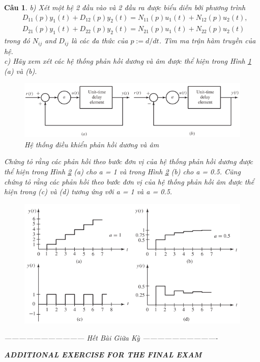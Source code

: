 \documentclass[11pt]{article}
\newtheorem{bt}{Câu}
\begin{document}
\begin{bt}
	\noindent b) Xét một hệ 2 đầu vào và 2 đầu ra được biểu diễn bởi phương trình
	\begin{align*}
		& D_{11}(p)y_1(t) + D_{12}(p)y_2(t) = N_{11}(p)u_1(t) + N_{12}(p)u_2(t), \\
		& D_{21}(p)y_1(t) + D_{22}(p)y_2(t) = N_{21}(p)u_1(t) + N_{22}(p)u_2(t)
	\end{align*}
	trong đó $N_{ij}$ and $D_{ij}$ là các đa thức của $p := d/dt$. Tìm ma trận hàm truyền của hệ.\\
	c) Hãy xem xét các hệ thống phản hồi dương và âm được thể hiện trong Hình \ref{fig:fig2} (a) và (b). 
	\begin{figure}[h!]
		\centering
		\includegraphics[width=1.0\linewidth]{Fig2.5}
		\caption{Hệ thống điều khiển phản hồi dương và âm}
		\label{fig:fig2}
	\end{figure}
	Chứng tỏ rằng các phản hồi theo bước đơn vị của hệ thống phản hồi dương được thể hiện trong Hình \ref{fig:fig3} (a) cho a = 1 và trong Hình \ref{fig:fig3} (b) cho a = 0.5. Cũng chứng tỏ rằng các phản hồi theo bước đơn vị của hệ thống phản hồi âm được thể hiện trong (c) và (d) tương ứng với a = 1 và a = 0.5.
	\begin{figure}[h!]
		\centering
		\includegraphics[width=1.0\linewidth]{Fig2.21}
		\caption{}
		\label{fig:fig3}
	\end{figure}
\centerline{——————————— Hết Bài Giữa Kỳ ——————————-}
\pagebreak 
\begin{center}
\textbf{ADDITIONAL EXERCISE FOR THE FINAL EXAM}
\end{center}
\end{bt}
\end{document}
